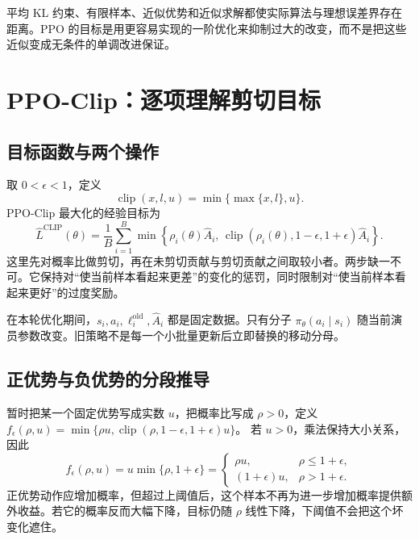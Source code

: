 \documentclass[UTF8,12pt,a4paper,fontset=fandol]{ctexart}
\begin{document}
平均 KL 约束、有限样本、近似优势和近似求解都使实际算法与理想误差界存在距离。PPO 的目标是用更容易实现的一阶优化来抑制过大的改变，而不是把这些近似变成无条件的单调改进保证。

\section{PPO-Clip：逐项理解剪切目标}
\label{sec:ppo-clipping}

\subsection{目标函数与两个操作}

取 $0<\epsilon<1$，定义
\[
  \operatorname{clip}(x,l,u)=\min\{\max\{x,l\},u\}.
\]
PPO-Clip 最大化的经验目标为\cite{schulman-ppo}
\begin{equation}
  \widehat L^{\mathrm{CLIP}}(\theta)
  =\frac1B\sum_{i=1}^B
    \min\!\left\{
      \rho_i(\theta)\widehat A_i,\,
      \operatorname{clip}(\rho_i(\theta),1-\epsilon,1+\epsilon)
      \widehat A_i
    \right\}.
  \label{eq:ppo-clip-objective}
\end{equation}
这里先对概率比做剪切，再在未剪切贡献与剪切贡献之间取较小者。两步缺一不可。它保持对“使当前样本看起来更差”的变化的惩罚，同时限制对“使当前样本看起来更好”的过度奖励。

在本轮优化期间，$s_i,a_i,\ell_i^{\mathrm{old}},\widehat A_i$ 都是固定数据。只有分子 $\pi_\theta(a_i\mid s_i)$ 随当前演员参数改变。旧策略不是每一个小批量更新后立即替换的移动分母。

\subsection{正优势与负优势的分段推导}

暂时把某一个固定优势写成实数 $u$，把概率比写成 $\rho>0$，定义
$f_\epsilon(\rho,u)=
\min\{\rho u,\operatorname{clip}(\rho,1-\epsilon,1+\epsilon)u\}$。
若 $u>0$，乘法保持大小关系，因此
\begin{equation}
  f_\epsilon(\rho,u)
  =u\min\{\rho,1+\epsilon\}
  =
  \begin{cases}
    \rho u,&\rho\le1+\epsilon,\\
    (1+\epsilon)u,&\rho>1+\epsilon.
  \end{cases}
  \label{eq:ppo-positive-clip}
\end{equation}
正优势动作应增加概率，但超过上阈值后，这个样本不再为进一步增加概率提供额外收益。若它的概率反而大幅下降，目标仍随 $\rho$ 线性下降，下阈值不会把这个坏变化遮住。
\end{document}

